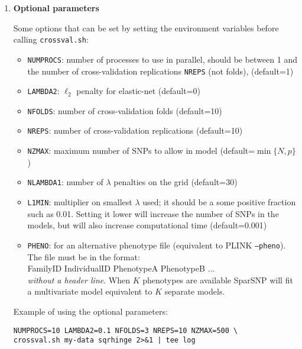 \documentclass[a4paper,11pt]{article}
\begin{document}
\begin{enumerate}
       \item \textbf{Optional parameters}



Some options that can be set by setting the environment variables before
calling \texttt{crossval.sh}:
\begin{itemize}

   \item \texttt{NUMPROCS}: number of processes to use in parallel, should be
   between 1 and the number of cross-validation replications \texttt{NREPS} (not folds),
   (default=1)

   \item \texttt{LAMBDA2}: $\ell_2$  penalty for elastic-net (default=0)

   \item \texttt{NFOLDS}: number of cross-validation folds (default=10)

   \item \texttt{NREPS}: number of cross-validation replications (default=10)

   \item \texttt{NZMAX}: maximum number of SNPs to allow in model
   (default=$\min \{N, p \}$)

   \item \texttt{NLAMBDA1}: number of $\lambda$ penalties on the grid
   (default=30)

   \item \texttt{L1MIN}: multiplier on smallest $\lambda$ used; it should
   be a some positive fraction such as 0.01. Setting it lower will increase
   the number of SNPs in the models, but will also increase computational time
   (default=0.001)

   \item \texttt{PHENO}: for an alternative phenotype file (equivalent to PLINK
   \texttt{--pheno}). The file must be in the format:\\
   FamilyID IndividualID PhenotypeA PhenotypeB ... \\
   \emph{without a header line}.
   When $K$ phenotypes are available SparSNP will fit a multivariate
   model equivalent to $K$ separate models.

\end{itemize}
Example of using the optional parameters:

\texttt{NUMPROCS=10 LAMBDA2=0.1 NFOLDS=3 NREPS=10 NZMAX=500  \textbackslash \\
crossval.sh my-data sqrhinge 2>\&1 | tee log}

\end{enumerate}



\end{document}
